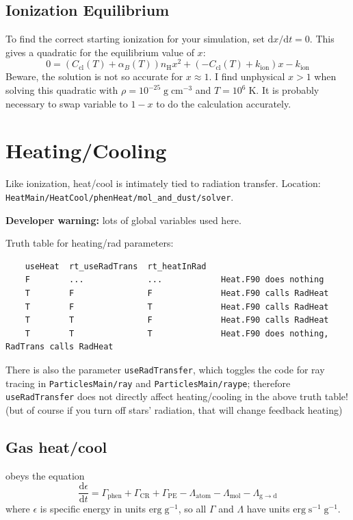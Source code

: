 \documentclass[10pt]{article}
\newcommand*{\mt}{\mathrm}
\newcommand*{\unit}[1]{\;\mt{#1}}  %
\newcommand*{\dtl}{\mathrm{d}}
\begin{document}
\subsection{Ionization Equilibrium}

To find the correct starting ionization for your simulation, set $\dtl x/\dtl t
= 0$.  This gives a quadratic for the equilibrium value of $x$:
\begin{equation}
    0 = \left( C_\mt{cl}(T) + \alpha_B(T) \right) n_\mt{H} x^2
    + \left(-C_\mt{cl}(T) + k_\mt{ion}\right) x
    - k_\mt{ion}
\end{equation}
Beware, the solution is not so accurate for $x \approx 1$.
I find unphysical $x > 1$ when solving this quadratic with $\rho = 10^{-25}
\unit{g\;cm^{-3}}$ and $T = 10^6 \unit{K}$.
It is probably necessary to swap variable to $1-x$ to do the calculation
accurately.


\section{Heating/Cooling}

Like ionization, heat/cool is intimately tied to radiation transfer.
Location: \\
\texttt{HeatMain/HeatCool/phenHeat/mol\_and\_dust/solver}.

\textbf{Developer warning:} lots of global variables used here.

Truth table for heating/rad parameters:
\begin{verbatim}
    useHeat  rt_useRadTrans  rt_heatInRad
    F        ...             ...            Heat.F90 does nothing
    T        F               F              Heat.F90 calls RadHeat
    T        F               T              Heat.F90 calls RadHeat
    T        T               F              Heat.F90 calls RadHeat
    T        T               T              Heat.F90 does nothing, RadTrans calls RadHeat
\end{verbatim}

There is also the parameter \texttt{useRadTransfer}, which toggles the code for
ray tracing in \texttt{ParticlesMain/ray} and \texttt{ParticlesMain/raype};
therefore \texttt{useRadTransfer} does not
directly affect heating/cooling in the above truth table! (but of course if you
turn off stars' radiation, that will change feedback heating)


\subsection{Gas heat/cool}
obeys the equation
\begin{equation}
    \frac{\dtl \epsilon}{\dtl t} =
    \Gamma_\mt{phen} + \Gamma_\mt{CR} + \Gamma_\mt{PE}
    - \Lambda_\mt{atom} - \Lambda_\mt{mol} - \Lambda_\mt{g\to d}
\end{equation}
where $\epsilon$ is specific energy in units $\mathrm{erg\;g^{-1}}$,
so all $\Gamma$ and $\Lambda$ have units $\mathrm{erg\;s^{-1}\;g^{-1}}$.
\end{document}
